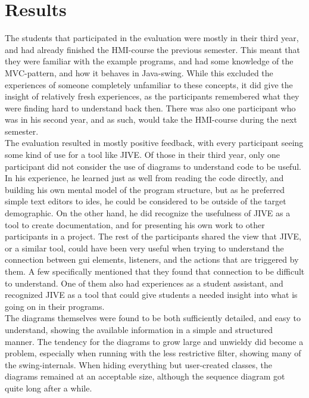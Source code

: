 \section{Results}\label{jiveEvalResults}
The students that participated in the evaluation were mostly in their third year, and had already finished the HMI-course the previous semester.
This meant that they were familiar with the example programs, and had some knowledge of the MVC-pattern, and how it behaves in Java-swing.
While this excluded the experiences of someone completely unfamiliar to these concepts, it did give the insight of relatively fresh experiences, as the participants remembered what they were finding hard to understand back then.
There was also one participant who was in his second year, and as such, would take the HMI-course during the next semester.
~\\

The evaluation resulted in mostly positive feedback, with every participant seeing some kind of use for a tool like JIVE.
Of those in their third year, only one participant did not consider the use of diagrams to understand code to be useful.
In his experience, he learned just as well from reading the code directly, and building his own mental model of the program structure, but as he preferred simple text editors to \gls{ide}s, he could be considered to be outside of the target demographic.
On the other hand, he did recognize the usefulness of JIVE as a tool to create documentation, and for presenting his own work to other participants in a project.
The rest of the participants shared the view that JIVE, or a similar tool, could have been very useful when trying to understand the connection between \gls{gui} elements, listeners, and the actions that are triggered by them.
A few specifically mentioned that they found that connection to be difficult to understand.
One of them also had experiences as a student assistant, and recognized JIVE as a tool that could give students a needed insight into what is going on in their programs.
~\\

The diagrams themselves were found to be both sufficiently detailed, and easy to understand, showing the available information in a simple and structured manner.
The tendency for the diagrams to grow large and unwieldy did become a problem, especially when running with the less restrictive filter, showing many of the swing-internals.
When hiding everything but user-created classes, the diagrams remained at an acceptable size, although the sequence diagram got quite long after a while.
~\\

